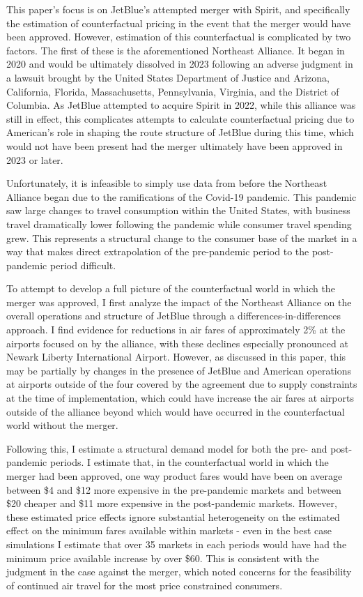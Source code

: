 \documentclass{article}
\begin{document}
	This paper's focus is on JetBlue's attempted merger with Spirit, and specifically the estimation of counterfactual pricing in the event that the merger would have been approved. However, estimation of this counterfactual is complicated by two factors. The first of these is the aforementioned Northeast Alliance. It began in 2020 and would be ultimately dissolved in 2023 following an adverse judgment in a lawsuit brought by the United States Department of Justice and Arizona, California, Florida, Massachusetts, Pennsylvania, Virginia, and the District of Columbia. As JetBlue attempted to acquire Spirit in 2022, while this alliance was still in effect, this complicates attempts to calculate counterfactual pricing due to American's role in shaping the route structure of JetBlue during this time, which would not have been present had the merger ultimately have been approved in 2023 or later. 
	
	Unfortunately, it is infeasible to simply use data from before the Northeast Alliance began due to the ramifications of the Covid-19 pandemic. This pandemic saw large changes to travel consumption within the United States, with business travel dramatically lower following the pandemic while consumer travel spending grew. This represents a structural change to the consumer base of the market in a way that makes direct extrapolation of the pre-pandemic period to the post-pandemic period difficult.
	
	To attempt to develop a full picture of the counterfactual world in which the merger was approved, I first analyze the impact of the Northeast Alliance on the overall operations and structure of JetBlue through a differences-in-differences approach. I find evidence for reductions in air fares of approximately 2\% at the airports focused on by the alliance, with these declines especially pronounced at Newark Liberty International Airport. However, as discussed in this paper, this may be partially by changes in the presence of JetBlue and American operations at airports outside of the four covered by the agreement due to supply constraints at the time of implementation, which could have increase the air fares at airports outside of the alliance beyond which would have occurred in the counterfactual world without the merger. 
	
	Following this, I estimate a structural demand model for both the pre- and post-pandemic periods. I estimate that, in the counterfactual world in which the merger had been approved, one way product fares would have been on average between \$4 and \$12 more expensive in the pre-pandemic markets and between \$20 cheaper and \$11 more expensive in the post-pandemic markets. However, these estimated price effects ignore substantial heterogeneity on the estimated effect on the minimum fares available within markets - even in the best case simulations I estimate that over 35 markets in each periods would have had the minimum price available increase by over \$60. This is consistent with the judgment in the case against the merger, which noted concerns for the feasibility of continued air travel for the most price constrained consumers. 
\end{document}
